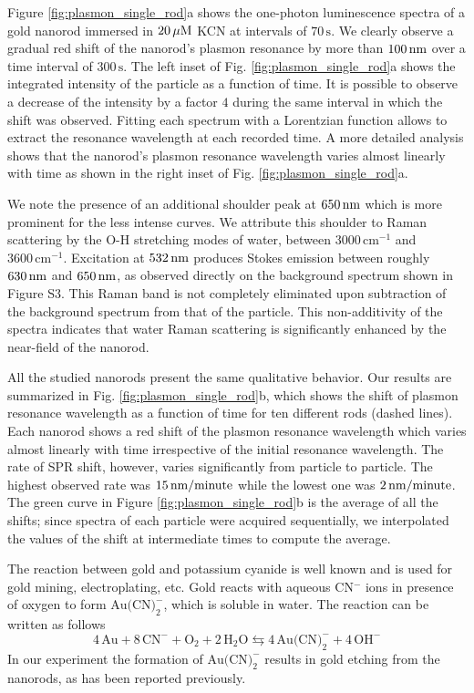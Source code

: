 Figure \ref{fig:plasmon_single_rod}a shows the one-photon luminescence spectra
of a gold nanorod immersed in $20\,\mu\textrm{M}$ KCN at intervals of $70\,\text{s}$. We
clearly observe a gradual red shift of the nanorod's plasmon resonance by more
than $100\,\textrm{nm}$ over a time interval of $300\,\text{s}$. The left inset of 
Fig. \ref{fig:plasmon_single_rod}a shows the integrated intensity of the
particle as a function of time. It is possible to observe a decrease of the intensity by a factor $4$ during the same
interval in which the shift was observed. Fitting each spectrum with a
Lorentzian function allows to extract the resonance wavelength at each recorded
time. A more detailed analysis shows that the nanorod's plasmon resonance
wavelength varies almost linearly with time as shown in the
right inset of Fig. \ref{fig:plasmon_single_rod}a.

We note the presence of an additional shoulder peak at $650\,\textrm{nm}$ which is more
prominent for the less intense curves. We attribute this shoulder to Raman
scattering by the O-H stretching modes of water, between $3000\,\text{cm}^{-1}$
and $3600\,\text{cm}^{-1}$. Excitation at $532\,\textrm{nm}$ produces Stokes emission
between roughly $630\,\textrm{nm}$ and $650\,\textrm{nm}$, as observed directly on the background
spectrum shown in Figure S3. This Raman band is not completely eliminated upon
subtraction of the background spectrum from that of the particle. This
non-additivity of the spectra indicates that water Raman scattering is
significantly enhanced by the near-field of the nanorod\cite{Snow1985}.

All the studied nanorods present the same qualitative behavior. Our results are
summarized in Fig. \ref{fig:plasmon_single_rod}b, which shows the shift of
plasmon resonance wavelength as a function of time for ten different rods (dashed
lines). Each nanorod shows a red shift of the plasmon resonance wavelength which
varies almost linearly with time irrespective of the initial resonance
wavelength. The rate of SPR shift, however, varies significantly from particle
to particle. The highest observed rate was $15\,\textrm{nm}/\textrm{minute}$ while the
lowest one was $2\,\textrm{nm}/\textrm{minute}$. The green curve in Figure
\ref{fig:plasmon_single_rod}b is the average of all the shifts; since spectra of
each particle were acquired sequentially, we interpolated the values of the
shift at intermediate times to compute the average.

The reaction between gold and potassium cyanide is well known and is used
for gold mining, electroplating, etc. Gold reacts with aqueous CN$^-$ ions in
presence of oxygen to form $\textrm{Au(CN)}_2^-$, which is soluble in water. The
reaction can be written as follows
\begin{equation*}
4\,\textrm{Au} + 8\,\textrm{CN}^-+\textrm{O}_2 + 2\,\textrm{H}_2\textrm{O}
\leftrightarrows 4\,\textrm{Au(CN)}_2^-+4\,\textrm{OH}^- \end{equation*}
In our experiment the formation of $\textrm{Au(CN)}_2^-$ results in gold etching
from the nanorods, as has been reported previously\cite{Jana2002}.

